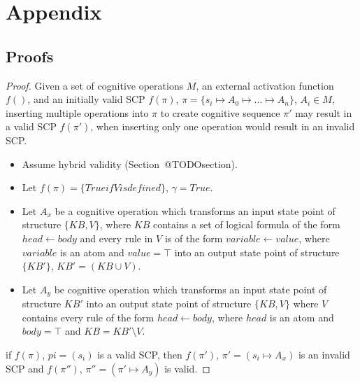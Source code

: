 \chapter*{Appendix} \label{chp:appendix}
\section{Proofs}
\iffalse 
\begin{proof} \label{proof:insertionSearch}
Given a set of cognitive operations $M$, an external activation function $f()$, and an initially valid SCP $f(\pi)$, $\pi=\{s_i \longmapsto A_0 \longmapsto ... \longmapsto A_n\}$, $A_i \in M$, inserting multiple operations into $\pi$ to create cognitive sequence $\pi'$ may result in a valid SCP $f(\pi')$, when inserting only one operation would result in an invalid SCP.

\begin{itemize}
\item Assume hybrid validity (Section~@TODOsection).
\item Let $f(\pi)=\{True if V is defined\}$, $\gamma = True$.
\item Let $A_x$ be a cognitive operation which transforms an input state point of structure $\{KB, V\}$, where $KB$ contains a set of logical formula of the form $head \leftarrow body$ and every rule in $V$ is of the form $variable \leftarrow value$, where $variable$ is an atom and  $value=\top$ into an output state point of structure $\{KB'\}$, $KB'=(KB \cup V)$.
\item Let $A_y$ be cognitive operation which transforms an input state point of structure $KB'$ into an output state point of structure $\{KB, V\}$ where $V$ contains every rule of the form $head \leftarrow body$, where $head$ is an atom and $body=\top$ and $KB= KB' \setminus V$.
\end{itemize}
\item if $f(\pi)$, $pi=(s_i)$ is a valid SCP, then $f(\pi')$, $\pi'=(s_i\longmapsto A_x)$ is an invalid SCP and $f(\pi'')$, $\pi''=(\pi'\longmapsto A_y)$ is valid.
\end{proof}

